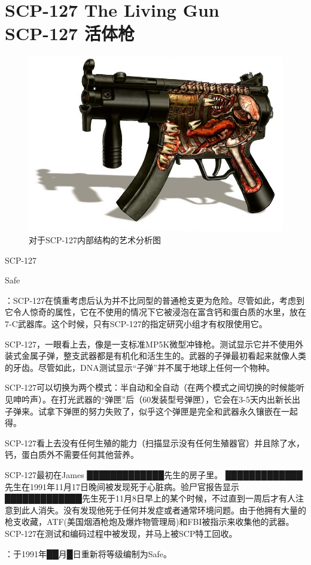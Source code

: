\chapter[SCP-127 活体枪]{
    SCP-127 The Living Gun\\
    SCP-127 活体枪
}

\label{chap:SCP-127}

\begin{figure}[H]
    \centering
    \includegraphics[width=0.5\linewidth]{images/SCP.127.jpg}
    \caption*{对于SCP-127内部结构的艺术分析图}
\end{figure}

SCP-127

Safe

：SCP-127在慎重考虑后认为并不比同型的普通枪支更为危险。尽管如此，考虑到它令人惊奇的属性，它在不使用的情况下它被浸泡在富含钙和蛋白质的水里，放在7-C武器库。这个时候，只有SCP-127的指定研究小组才有权限使用它。

SCP-127，一眼看上去，像是一支标准MP5K微型冲锋枪。测试显示它并不使用外装式金属子弹，整支武器都是有机化和活生生的。武器的子弹最初看起来就像人类的牙齿。尽管如此，DNA测试显示“子弹”并不属于地球上任何一个物种。

SCP-127可以切换为两个模式：半自动和全自动（在两个模式之间切换的时候能听见呻吟声）。在打光武器的“弹匣”后（60发装型号弹匣），它会在3-5天内出新长出子弹来。试拿下弹匣的努力失败了，似乎这个弹匣是完全和武器永久镶嵌在一起得。

SCP-127看上去没有任何生殖的能力（扫描显示没有任何生殖器官）并且除了水，钙，蛋白质外不需要任何其他营养。

SCP-127最初在James █████████████先生的房子里。 █████████████先生在1991年11月17日晚间被发现死于心脏病。验尸官报告显示 █████████████先生死于11月8日早上的某个时候，不过直到一周后才有人注意到此人消失。没有发现他死于任何并发症或者通常环境问题。由于他拥有大量的枪支收藏，ATF(美国烟酒枪炮及爆炸物管理局)和FBI被指示来收集他的武器。SCP-127在测试和编码过程中被发现，并马上被SCP特工回收。

：于1991年██月█日重新将等级编制为Safe。
